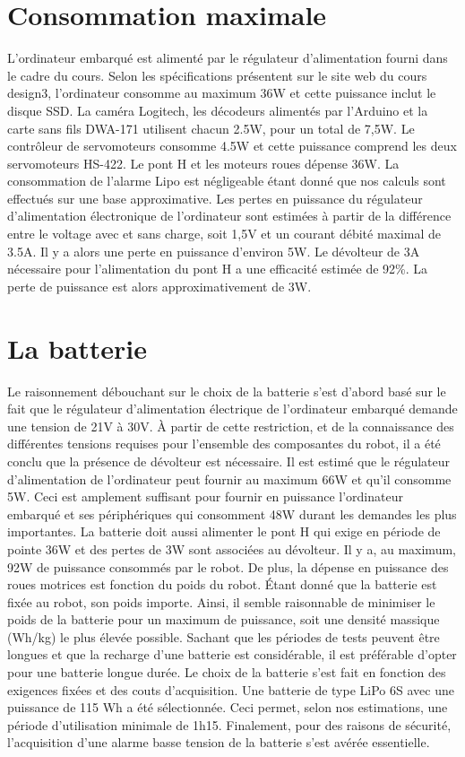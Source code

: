 \section{Consommation maximale}
L'ordinateur embarqué est alimenté par le régulateur d'alimentation fourni dans le cadre du cours. Selon les spécifications présentent sur le site web du cours design3,
l'ordinateur consomme au maximum 36W et cette puissance inclut le disque SSD. La caméra Logitech, les décodeurs alimentés par l'Arduino et la carte sans fils DWA-171 utilisent chacun 2.5W,
pour un total de 7,5W. Le contrôleur de servomoteurs consomme 4.5W et cette puissance comprend les deux servomoteurs HS-422. Le pont H et les moteurs roues dépense 36W. La consommation de l'alarme
Lipo est négligeable étant donné que nos calculs sont effectués sur une base approximative. Les pertes en puissance du régulateur d'alimentation électronique de l'ordinateur sont estimées à partir
de la différence entre le voltage avec et sans charge, soit 1,5V et un courant débité maximal de 3.5A. Il y a alors une perte en puissance d'environ 5W. Le dévolteur de 3A nécessaire pour
l'alimentation du pont H a une efficacité estimée de 92\%. La perte de puissance est alors approximativement de 3W.

\section{La batterie}
Le raisonnement débouchant sur le choix de la batterie s'est d'abord basé sur le fait que le régulateur d'alimentation électrique de l'ordinateur embarqué demande une tension de 21V à 30V.
À partir de cette restriction, et de la connaissance des différentes tensions  requises pour l'ensemble des composantes du robot, il a été conclu que la présence de dévolteur est nécessaire.
Il est estimé que le régulateur d'alimentation de l'ordinateur peut fournir au maximum 66W et qu'il consomme 5W. Ceci est amplement suffisant pour fournir en puissance l'ordinateur embarqué et ses
périphériques qui consomment 48W durant les demandes les plus importantes. La batterie doit aussi alimenter le pont H qui exige en période de pointe 36W et des pertes de 3W sont associées au dévolteur.
Il y a, au maximum, 92W de puissance consommés par le robot. De plus, la dépense en puissance des roues motrices est fonction du poids du robot. Étant donné que la batterie est fixée au robot, son poids
importe. Ainsi, il semble raisonnable de  minimiser le poids de la batterie pour un maximum de puissance, soit une densité massique (Wh/kg) le plus élevée possible. Sachant que les périodes de tests peuvent
être longues et que la recharge d'une batterie est considérable, il est préférable d'opter pour une batterie longue durée. Le choix de la batterie s'est fait en fonction des exigences fixées et des couts
d'acquisition. Une batterie de type LiPo 6S avec une puissance de 115 Wh a été sélectionnée. Ceci permet, selon nos estimations, une période d'utilisation minimale de 1h15. Finalement, pour des raisons de
sécurité, l'acquisition d'une alarme basse tension de la batterie s'est avérée essentielle.


